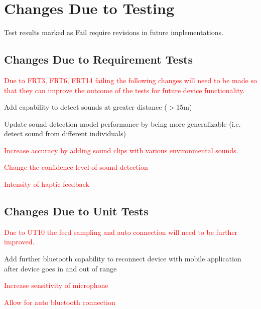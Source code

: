 \documentclass[12pt, titlepage]{article}
\begin{document}
\section{Changes Due to Testing}
Test results marked as {\color[HTML]{FE0000} Fail} require revisions in future implementations. 
\subsection{Changes Due to Requirement Tests}
\textcolor{red}{Due to FRT3, FRT6, FRT14 failing the following changes will need to be made so that they can improve the outcome of the tests for future device functionality. }
\begin{itemize}
  \item Add capability to detect sounds at greater distance ($>$15m)
  \item Update sound detection model performance by being more generalizable (i.e. detect sound from different individuals)
  \textcolor{red}{
  \item Increase accuracy by adding sound clips with various environmental sounds.
  \item Change the confidence level of sound detection
  \item Intensity of haptic feedback
}
\end{itemize}
\subsection{Changes Due to Unit Tests}
\textcolor{red}{Due to UT10 the feed sampling and auto connection will need to be further improved.}
\begin{itemize}
  \item Add further bluetooth capability to reconnect device with mobile application after device goes in and
   out of range
\textcolor{red}{
  \item Increase sensitivity of microphone
  \item Allow for auto bluetooth connection
}
\end{itemize}
\end{document}
